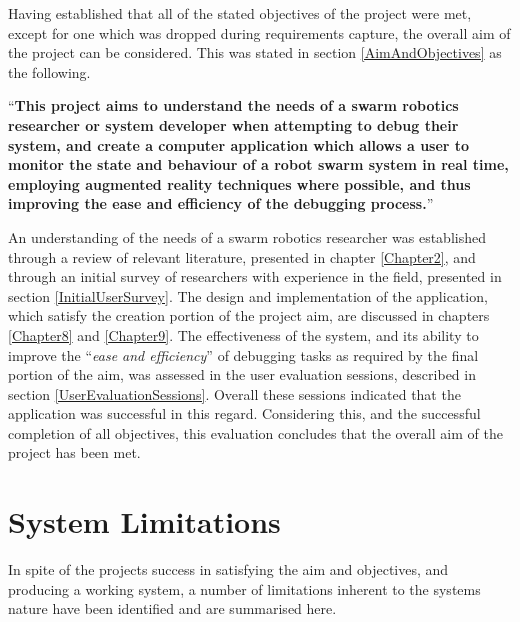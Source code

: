 Having established that all of the stated objectives of the project were met, except for one which was dropped during requirements capture, the overall aim of the project can be considered. This was stated in section \ref{AimAndObjectives} as the following.

``\textbf{This project aims to understand the needs of a swarm robotics researcher or system developer when attempting to debug their system, and create a computer application which allows a user to monitor the state and behaviour of a robot swarm system in real time, employing augmented reality techniques where possible, and thus improving the ease and efficiency of the debugging process.}''

An understanding of the needs of a swarm robotics researcher was established through a review of relevant literature, presented in chapter \ref{Chapter2}, and through an initial survey of researchers with experience in the field, presented in section \ref{InitialUserSurvey}. The design and implementation of the application, which satisfy the creation portion of the project aim, are discussed in chapters \ref{Chapter8} and \ref{Chapter9}. The effectiveness of the system, and its ability to improve the ``\textit{ease and efficiency}'' of debugging tasks as required by the final portion of the aim, was assessed in the user evaluation sessions, described in section \ref{UserEvaluationSessions}. Overall these sessions indicated that the application was successful in this regard. Considering this, and the successful completion of all objectives, this evaluation concludes that the overall aim of the project has been met.


\section{System Limitations}

In spite of the projects success in satisfying the aim and objectives, and producing a working system, a number of limitations inherent to the systems nature have been identified and are summarised here.

